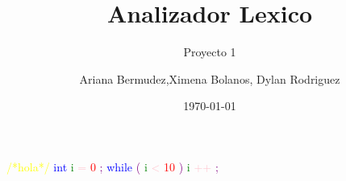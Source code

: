 \documentclass{beamer}
\title{Analizador Lexico}
\subtitle{Proyecto 1}
\author{Ariana Bermudez,Ximena Bolanos, Dylan Rodriguez}
\institute{Instituto Tecnologico de Costa Rica}
\date{\today}
\begin{document}
\begin{frame}
\textcolor{yellow}{/*hola*/} \textcolor{blue}{int} \textcolor{green}{i} \textcolor{pink}{=} \textcolor{red}{0} \textcolor{purple}{;} \textcolor{blue}{while} \textcolor{purple}{(} \textcolor{green}{i} \textcolor{pink}{<} \textcolor{red}{10} \textcolor{purple}{)} \textcolor{purple}{{} \textcolor{green}{i} \textcolor{pink}{++} \textcolor{purple}{;} \textcolor{purple}{}} \textcolor{white}{} 
\end{frame}
\end{document}

